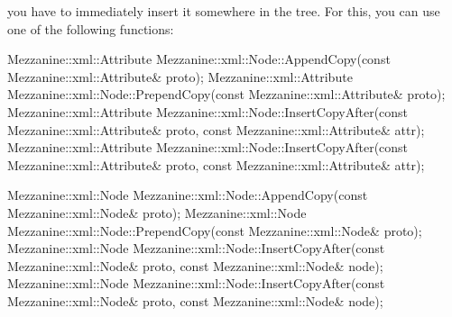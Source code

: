 \begin{DoxyItemize}
\item you have to immediately insert it somewhere in the tree. For this, you can use one of the following functions: 
\begin{DoxyCode}
 Mezzanine::xml::Attribute Mezzanine::xml::Node::AppendCopy(const 
      Mezzanine::xml::Attribute& proto);
 Mezzanine::xml::Attribute Mezzanine::xml::Node::PrependCopy(const 
      Mezzanine::xml::Attribute& proto);
 Mezzanine::xml::Attribute Mezzanine::xml::Node::InsertCopyAfter(const 
      Mezzanine::xml::Attribute& proto, const Mezzanine::xml::Attribute& attr);
 Mezzanine::xml::Attribute Mezzanine::xml::Node::InsertCopyAfter(const 
      Mezzanine::xml::Attribute& proto, const Mezzanine::xml::Attribute& attr);

 Mezzanine::xml::Node Mezzanine::xml::Node::AppendCopy(const 
      Mezzanine::xml::Node& proto);
 Mezzanine::xml::Node Mezzanine::xml::Node::PrependCopy(const 
      Mezzanine::xml::Node& proto);
 Mezzanine::xml::Node Mezzanine::xml::Node::InsertCopyAfter(const 
      Mezzanine::xml::Node& proto, const Mezzanine::xml::Node& node);
 Mezzanine::xml::Node Mezzanine::xml::Node::InsertCopyAfter(const 
      Mezzanine::xml::Node& proto, const Mezzanine::xml::Node& node);
\end{DoxyCode}

\end{DoxyItemize}

